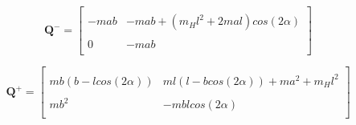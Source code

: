 \documentclass{./springer/svjour3}
\newcommand{\mb}[1]{\mathbf{#1}}
\begin{document}
\begin{equation}
\mb{Q^-} = 
\label{eq:Q-}
\begin{bmatrix}
\\-mab & -mab + (m_Hl^2+2mal)cos(2\alpha)\\
\\0 & -mab\\
\end{bmatrix}
\end{equation}

\begin{equation}
\mb{Q^+} = 
\label{eq:Q+}
\begin{bmatrix}
\\mb(b-lcos(2\alpha)) & ml(l-bcos(2\alpha)) + ma^2 + m_Hl^2\\
\\mb^2 & -mblcos(2\alpha)\\
\end{bmatrix}
\end{equation}
\end{document}
